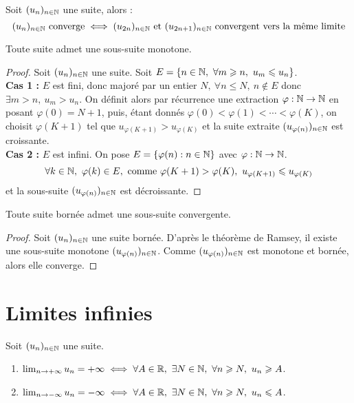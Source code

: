 \begin{proposition}
    Soit $(u_n)_{n \in \mathbb{N}}$ une suite, alors :
    \[ (u_n)_{n \in \mathbb{N}} \text{ converge} \iff (u_{2n})_{n \in \mathbb{N}} \text{ et } (u_{2n + 1})_{n \in \mathbb{N}} \text{ convergent vers la même limite} \]
\end{proposition}

\begin{theorem}
    Toute suite admet une sous-suite monotone.
\end{theorem}

\begin{proof}
    Soit $(u_n)_{n \in \mathbb{N}}$ une suite. Soit $E = \{ n \in \N,\ \forall m \geq n,\ u_m \leq u_n \}$.
    \\ 
    \textbf{Cas 1 :} $E$ est fini, donc majoré par un entier $N,\ \forall n \leq N,\ n \notin E$ donc $\exists m > n,\ u_m > u_n$. On définit alors par récurrence une extraction $\varphi : \mathbb{N} \to \mathbb{N}$ en posant $\varphi(0) = N + 1$, puis, étant donnés $\varphi(0) < \varphi(1) < \cdots < \varphi(K)$, on choisit $\varphi(K + 1)$ tel que $u_{\varphi(K+1)} > u_{\varphi(K)}$ et la suite extraite $(u_{\varphi(n)})_{n \in \mathbb{N}}$ est croissante.
    \\ 
    \textbf{Cas 2 :} $E$ est infini. On pose $E = \{ \varphi(n) : n \in \mathbb{N} \}$ avec $\varphi : \mathbb{N} \to \mathbb{N}$.
    \[ \forall k \in \mathbb{N},\ \varphi(k) \in E, \text{ comme } \varphi(K + 1) > \varphi(K),\ u_{\varphi(K+1)} \leqslant u_{\varphi(K)} \]
    et la sous-suite $(u_{\varphi(n)})_{n \in \mathbb{N}}$ est décroissante.
\end{proof}

\begin{theorem}
    Toute suite bornée admet une sous-suite convergente.
\end{theorem}

\begin{proof}
    Soit $(u_n)_{n \in \mathbb{N}}$ une suite bornée. D'après le théorème de Ramsey, il existe une sous-suite monotone $(u_{\varphi(n)})_{n \in \mathbb{N}}$. Comme $(u_{\varphi(n)})_{n \in \mathbb{N}}$ est monotone et bornée, alors elle converge.
\end{proof}

\section{Limites infinies}

\begin{definition}
    Soit $(u_n)_{n \in \mathbb{N}}$ une suite.
    \begin{enumerate}
        \item $\lim_{n \to +\infty} u_n = +\infty \iff \forall A \in \mathbb{R},\ \exists N \in \mathbb{N},\ \forall n \geqslant N,\ u_n \geqslant A$.
        \item $\lim_{n \to -\infty} u_n = -\infty \iff \forall A \in \mathbb{R},\ \exists N \in \mathbb{N},\ \forall n \geqslant N,\ u_n \leqslant A$.
    \end{enumerate}
\end{definition}

